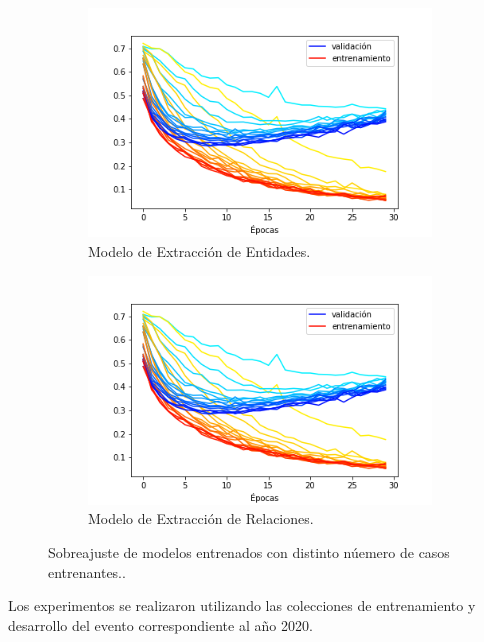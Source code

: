 \begin{figure}[h!]
	\centering
	\begin{subfigure}{.5\linewidth}
		\centering
		\includegraphics[width=\linewidth]{Graphics/color_scaled_train_graphs.png}
		\caption{Modelo de Extracción de Entidades.}
	\end{subfigure}%
	\begin{subfigure}{.5\linewidth}
		\centering
		\includegraphics[width=\linewidth]{Graphics/color_scaled_train_graphs.png}
		\caption{Modelo de Extracción de Relaciones.}
	\end{subfigure}
	\caption{Sobreajuste de modelos entrenados con distinto núemero de casos entrenantes.. } \label{fig:color_scaled_train_graphs}
\end{figure}


Los experimentos se realizaron utilizando las colecciones de entrenamiento y desarrollo del evento correspondiente al año 2020.


